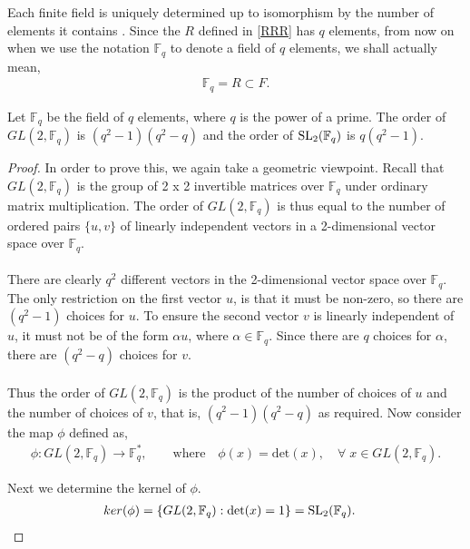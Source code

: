 Each finite field is uniquely determined up to isomorphism by the number of elements it contains \cite[p.227]{stewart}. Since the $R$ defined in \eqref{RRR} has $q$ elements, from now on when we use the notation $\mathbb{F}_q$ to denote a field of $q$ elements, we shall actually mean,
\begin{align}\label{subfield} \mathbb{F}_q = R \subset F.
\end{align}

\begin{lemma}\label{ordersl2q} Let $\mathbb{F}_q$ be the field of $q$ elements, where $q$ is the power of a prime. The order of $GL(2,\mathbb{F}_q)$ is $(q^2-1)(q^2-q)$ and the order of $\operatorname{SL}_2(\mathbb{F}_q)$ is $q(q^2-1)$.
\end{lemma}

\begin{proof} In order to prove this, we again take a geometric viewpoint. Recall that $GL(2,\mathbb{F}_q)$ is the group of 2 x 2 invertible matrices over $\mathbb{F}_q$ under ordinary matrix multiplication. The order of $GL(2,\mathbb{F}_q)$ is thus equal to the number of ordered pairs $\{u,v\}$ of linearly independent vectors in a 2-dimensional vector space over $\mathbb{F}_q$. \\
\\
There are clearly $q^2$ different vectors in the 2-dimensional vector space over $\mathbb{F}_q$. The only restriction on the first vector $u$, is that it must be non-zero, so there are $(q^2 - 1)$ choices for $u$. To ensure the second vector $v$ is linearly independent of $u$, it must not be of the form $\alpha u$, where $\alpha \in \mathbb{F}_q$. Since there are $q$ choices for $\alpha$, there are $(q^2-q)$ choices for $v$. \\
\\
Thus the order of $GL(2,\mathbb{F}_q)$ is the product of the number of choices of $u$ and the number of choices of $v$, that is, $(q^2-1)(q^2-q)$ as required. Now consider the map $\phi$ defined as,
\begin{align*} \phi : GL(2,\mathbb{F}_q) \longrightarrow \mathbb{F}^*_q, \qquad \text{where} \quad \! \! \phi(x) = \text{det}(x), \quad \forall \; x \in GL(2,\mathbb{F}_q).
\end{align*}

Next we determine the kernel of $\phi$.
\begin{align*} ker(\phi) &= \{  GL(2,\mathbb{F}_q) : \text{det}(x) = 1 \} = \operatorname{SL}_2(\mathbb{F}_q).
\end{align*}


\end{proof}
